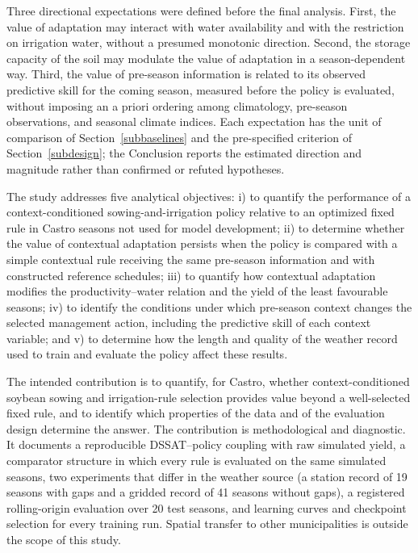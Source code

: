 \documentclass[times,final,authoryear]{elsarticle}
\begin{document}
Three directional expectations were defined before the final analysis. First, the value of adaptation may interact with water availability and with the restriction on irrigation water, without a presumed monotonic direction. Second, the storage capacity of the soil may modulate the value of adaptation in a season-dependent way. Third, the value of pre-season information is related to its observed predictive skill for the coming season, measured before the policy is evaluated, without imposing an a priori ordering among climatology, pre-season observations, and seasonal climate indices. Each expectation has the unit of comparison of Section~\ref{subbaselines} and the pre-specified criterion of Section~\ref{subdesign}; the Conclusion reports the estimated direction and magnitude rather than confirmed or refuted hypotheses.

The study addresses five analytical objectives: i) to quantify the performance of a context-conditioned sowing-and-irrigation policy relative to an optimized fixed rule in Castro seasons not used for model development; ii) to determine whether the value of contextual adaptation persists when the policy is compared with a simple contextual rule receiving the same pre-season information and with constructed reference schedules; iii) to quantify how contextual adaptation modifies the productivity--water relation and the yield of the least favourable seasons; iv) to identify the conditions under which pre-season context changes the selected management action, including the predictive skill of each context variable; and v) to determine how the length and quality of the weather record used to train and evaluate the policy affect these results.

The intended contribution is to quantify, for Castro, whether context-conditioned soybean sowing and irrigation-rule selection provides value beyond a well-selected fixed rule, and to identify which properties of the data and of the evaluation design determine the answer. The contribution is methodological and diagnostic. It documents a reproducible DSSAT--policy coupling with raw simulated yield, a comparator structure in which every rule is evaluated on the same simulated seasons, two experiments that differ in the weather source (a station record of 19 seasons with gaps and a gridded record of 41 seasons without gaps), a registered rolling-origin evaluation over 20 test seasons, and learning curves and checkpoint selection for every training run. Spatial transfer to other municipalities is outside the scope of this study.
\end{document}
